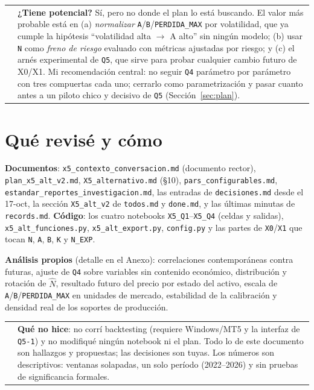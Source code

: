 \documentclass[11pt,a4paper]{article}
\makeatletter
\newcommand{\code}[1]{\texttt{\small #1}}
\newenvironment{caja}[1]{%
  \par\medskip\noindent
  \begin{tabular}{@{}p{0.4em}@{\hspace{8pt}}p{\dimexpr\linewidth-2em\relax}@{}}
  \textcolor{#1}{\rule{3pt}{1.1em}} &
}{\end{tabular}\par\medskip}
\newenvironment{nota}{\begin{caja}{cnaranja}}{\end{caja}}
\newenvironment{clave}{\begin{caja}{cmorado}}{\end{caja}}
\makeatother
\begin{document}
\begin{clave}
\textbf{¿Tiene potencial?} Sí, pero no donde el plan lo está buscando. El valor más probable está en
(a) \emph{normalizar} \code{A}/\code{B}/\code{PERDIDA\_MAX} por volatilidad, que ya cumple la
hipótesis ``volatilidad alta $\rightarrow$ A alto'' sin ningún modelo; (b) usar \code{N} como
\emph{freno de riesgo} evaluado con métricas ajustadas por riesgo; y (c) el arnés experimental de
\code{Q5}, que sirve para probar cualquier cambio futuro de X0/X1. Mi recomendación central: no
seguir \code{Q4} parámetro por parámetro con tres compuertas cada uno; cerrarlo como parametrización
y pasar cuanto antes a un piloto chico y decisivo de \code{Q5} (Sección~\ref{sec:plan}).
\end{clave}

\section{Qué revisé y cómo}

\textbf{Documentos}: \code{x5\_contexto\_conversacion.md} (documento rector), \code{plan\_x5\_alt\_v2.md},
\code{X5\_alternativo.md} (§10), \code{pars\_configurables.md}, \code{estandar\_reportes\_investigacion.md},
las entradas de \code{decisiones.md} desde el 17-oct, la sección \code{X5\_alt\_v2} de \code{todos.md} y
\code{done.md}, y las últimas minutas de \code{records.md}. \textbf{Código}: los cuatro notebooks
\code{X5\_Q1}–\code{X5\_Q4} (celdas y salidas), \code{x5\_alt\_funciones.py}, \code{x5\_alt\_export.py},
\code{config.py} y las partes de \code{X0}/\code{X1} que tocan \code{N}, \code{A}, \code{B}, \code{K} y
\code{N\_EXP}.

\textbf{Análisis propios} (detalle en el Anexo): correlaciones contemporáneas contra futuras, ajuste de
\code{Q4} sobre variables sin contenido económico, distribución y rotación de $\hat N$, resultado
futuro del precio por estado del activo, escala de \code{A}/\code{B}/\code{PERDIDA\_MAX} en unidades
de mercado, estabilidad de la calibración y densidad real de los soportes de producción.

\begin{nota}
\textbf{Qué no hice}: no corrí backtesting (requiere Windows/MT5 y la interfaz de \code{Q5-1}) y no
modifiqué ningún notebook ni el plan. Todo lo de este documento son hallazgos y propuestas; las
decisiones son tuyas. Los números son descriptivos: ventanas solapadas, un solo período (2022--2026)
y sin pruebas de significancia formales.
\end{nota}
\end{document}

